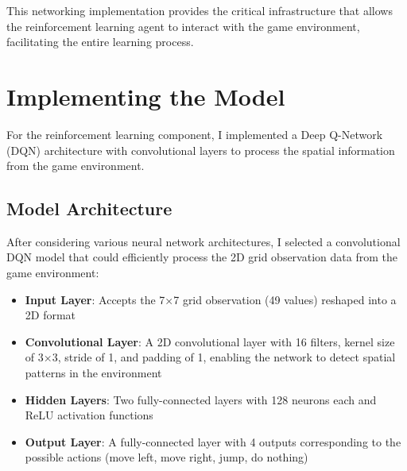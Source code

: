 This networking implementation provides the critical infrastructure that allows the reinforcement learning agent to interact with the game environment, facilitating the entire learning process.

\section{Implementing the Model}

For the reinforcement learning component, I implemented a Deep Q-Network (DQN) architecture with convolutional layers to process the spatial information from the game environment.

\subsection{Model Architecture}

After considering various neural network architectures, I selected a convolutional DQN model that could efficiently process the 2D grid observation data from the game environment:

\begin{itemize}
    \item \textbf{Input Layer}: Accepts the 7×7 grid observation (49 values) reshaped into a 2D format
    \item \textbf{Convolutional Layer}: A 2D convolutional layer with 16 filters, kernel size of 3×3, stride of 1, and padding of 1, enabling the network to detect spatial patterns in the environment
    \item \textbf{Hidden Layers}: Two fully-connected layers with 128 neurons each and ReLU activation functions
    \item \textbf{Output Layer}: A fully-connected layer with 4 outputs corresponding to the possible actions (move left, move right, jump, do nothing)
\end{itemize}

